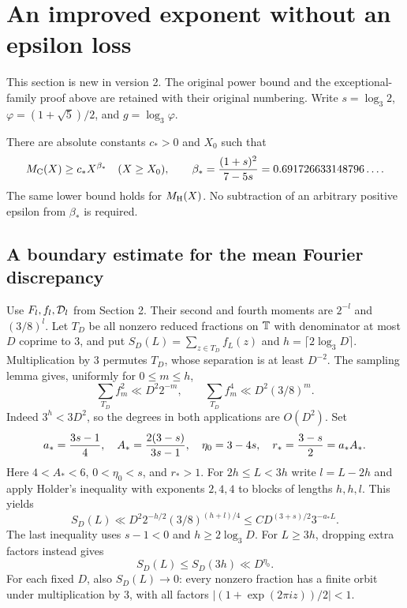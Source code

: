\section{An improved exponent without an epsilon loss}\label{ep:section}

This section is new in version 2. The original power bound and the
exceptional-family proof above are retained with their original numbering.
Write $s=\log_3 2$, $\varphi=(1+\sqrt5)/2$, and $g=\log_3\varphi$.

\begin{theorem}\label{ep:main}
There are absolute constants $c_*>0$ and $X_0$ such that
\[
 M_{\mathrm C}(X)\ge c_*X^{\beta_*}\quad(X\ge X_0),\qquad
 \beta_*={ (1+s)^2\over7-5s}=0.691726633148796\ldots.
\]
The same lower bound holds for $M_{\mathrm H}(X)$. No subtraction of an arbitrary
positive epsilon from $\beta_*$ is required.
\end{theorem}

\subsection{A boundary estimate for the mean Fourier discrepancy}
Use $F_l,f_l,\mathcal D_l$ from Section 2. Their second and fourth moments are
$2^{-l}$ and $(3/8)^l$. Let $T_D$ be all nonzero reduced fractions on
$\mathbb T$ with denominator at most $D$ coprime to 3, and put
$S_D(L)=\sum_{z\in T_D}f_L(z)$ and $h=\lceil2\log_3D\rceil$.
Multiplication by 3 permutes $T_D$, whose separation is at least $D^{-2}$.
The sampling lemma gives, uniformly for $0\le m\le h$,
\[
 \sum_{T_D}f_m^2\ll D^2 2^{-m},\qquad
 \sum_{T_D}f_m^4\ll D^2(3/8)^m.
\]
Indeed $3^h<3D^2$, so the degrees in both applications are $O(D^2)$.
Set
\[
 a_*={3s-1\over4},\quad A_*={2(3-s)\over3s-1},\quad
 \eta_0=3-4s,\quad r_*={3-s\over2}=a_*A_*.
\]
Here $4<A_*<6$, $0<\eta_0<s$, and $r_*>1$.
For $2h\le L<3h$ write $l=L-2h$ and apply Holder's inequality
with exponents $2,4,4$ to blocks of lengths $h,h,l$. This yields
\begin{equation}\label{ep:farey}
 S_D(L)\ll D^2 2^{-h/2}(3/8)^{(h+l)/4}
 \le C D^{(3+s)/2}3^{-a_*L}.
\end{equation}
The last inequality uses $s-1<0$ and $h\ge2\log_3D$.
For $L\ge3h$, dropping extra factors instead gives
\begin{equation}\label{ep:long}
 S_D(L)\le S_D(3h)\ll D^{\eta_0}.
\end{equation}
For each fixed $D$, also $S_D(L)\to0$: every nonzero fraction has a
finite orbit under multiplication by 3, with all factors
$|(1+\exp(2\pi iz))/2|<1$.

